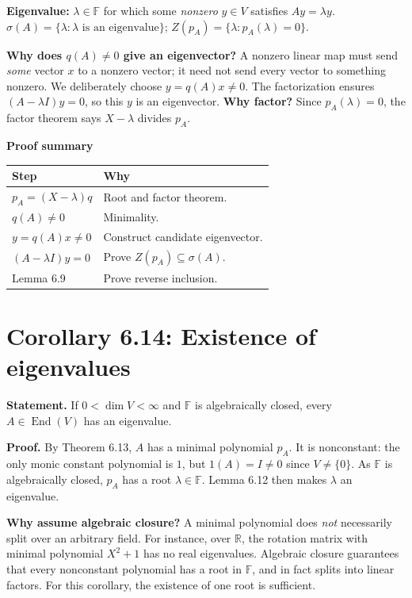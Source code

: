 \documentclass[11pt,a4paper]{article}
\newcommand{\F}{\mathbb F}
\newcommand{\prooftable}[1]{\medskip\textbf{Proof summary}\par\smallskip #1\medskip}
\begin{document}
\begin{personalnote}[title=Definitions for understanding]
\textbf{Eigenvalue:} \(\lambda\in\F\) for which some \emph{nonzero}
\(y\in V\) satisfies \(Ay=\lambda y\).
\(\sigma(A)=\{\lambda:\lambda\text{ is an eigenvalue}\}\);
\(Z(p_A)=\{\lambda:p_A(\lambda)=0\}\).
\end{personalnote}
\begin{personalnote}
\textbf{Why does \(q(A)\neq0\) give an eigenvector?}
A nonzero linear map must send \emph{some} vector \(x\) to a nonzero vector;
it need not send every vector to something nonzero.
We deliberately choose \(y=q(A)x\neq0\).
The factorization ensures \((A-\lambda I)y=0\), so this \(y\) is an eigenvector.
\textbf{Why factor?} Since \(p_A(\lambda)=0\), the factor theorem says
\(X-\lambda\) divides \(p_A\).
\end{personalnote}
\prooftable{\begin{tabularx}{\linewidth}{@{}p{.28\linewidth}X@{}}\hline
Step & Why\\\hline
\(p_A=(X-\lambda)q\) & Root and factor theorem.\\
\(q(A)\neq0\) & Minimality.\\
\(y=q(A)x\neq0\) & Construct candidate eigenvector.\\
\((A-\lambda I)y=0\) & Prove \(Z(p_A)\subseteq\sigma(A)\).\\
Lemma 6.9 & Prove reverse inclusion.\\\hline
\end{tabularx}}

\section*{Corollary 6.14: Existence of eigenvalues}
\textbf{Statement.} If \(0<\dim V<\infty\) and \(\F\) is algebraically
closed, every \(A\in\operatorname{End}(V)\) has an eigenvalue.

\textbf{Proof.} By Theorem 6.13, \(A\) has a minimal polynomial \(p_A\).
It is nonconstant: the only monic constant polynomial is \(1\), but
\(1(A)=I\neq0\) since \(V\neq\{0\}\).
As \(\F\) is algebraically closed, \(p_A\) has a root \(\lambda\in\F\).
Lemma 6.12 then makes \(\lambda\) an eigenvalue.
\begin{personalnote}
\textbf{Why assume algebraic closure?}
A minimal polynomial does \emph{not} necessarily split over an arbitrary field. For instance, over \(\mathbb R\), the rotation matrix with minimal polynomial \(X^2+1\) has no real eigenvalues. Algebraic closure guarantees that every nonconstant polynomial has a root in \(\mathbb F\), and in fact splits into linear factors. For this corollary, the existence of one root is sufficient.
\end{personalnote}
\end{document}
